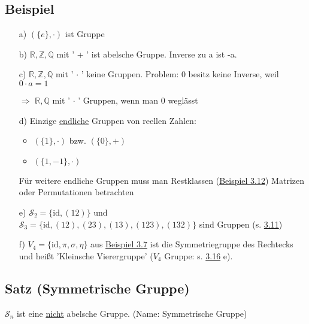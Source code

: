 \documentclass[a4paper, 12pt,titlepage, pdf, headsepline]{article}
\newcommand{\R}{\mathds{R}}
\newcommand{\uline}[1]{\underline{#1}}
\newcommand{\id}{\textrm{id}}
\renewcommand{\>}{\rightarrow}
\renewcommand{\*}{\cdot}
\begin{document}
	      \subsection{Beispiel}
	      \label{3.10}
	      \begin{itemize}
	      	\item[a)] $(\{e\}, \cdot )$ ist Gruppe
	      	\item[b)] $\R, \mathds{Z}, \mathds{Q}$ mit ' + ' ist abelsche Gruppe. Inverse zu a ist -a.
	      	\item[c)] $\R, \mathds{Z}, \mathds{Q}$ mit ' $\cdot$ ' keine Gruppen. Problem: 0 besitz keine Inverse, weil \\
	      	      $0 \cdot a = 1$\Lightning
	      	\item[$\Rightarrow$]  $\R, \mathds{Q}$ mit ' $\cdot$ ' Gruppen, wenn man 0 weglässt
	      	\item[d)] Einzige \uline{endliche} Gruppen von reellen Zahlen: 
	      	      \begin{itemize}
	      	      	\item $(\{1\}, \cdot )$ bzw. $(\{0\}, + )$
	      	      	\item $(\{1,-1\}, \cdot)$
	      	      \end{itemize}
	      	      Für weitere endliche Gruppen muss man Restklassen (\hyperref[3.12]{Beispiel 3.12}) Matrizen oder Permutationen betrachten
	      	\item[e)] $\mathscr{S}_2 = \{\id, (12)\}$ und \\
	      	      $\mathscr{S}_3 = \{\id, (12), (23),(13),(123),(132)\}$ sind Gruppen (s. \hyperref[3.11]{3.11})
	      	\item[f)] $V_4 = \{\id, \pi, \sigma, \eta \}$ aus \hyperref[3.7]{Beispiel 3.7} ist die Symmetriegruppe des Rechtecks und heißt 'Kleinsche Vierergruppe' ($V_4$ Gruppe: s. \hyperref[3.16]{3.16} e).
	      \end{itemize}
	      \subsection{Satz (Symmetrische Gruppe)}
	      \label{3.11}
	      $\mathscr{S}_n$ ist eine \uline{nicht} abelsche Gruppe. (Name: Symmetrische Gruppe) \\
\end{document}
